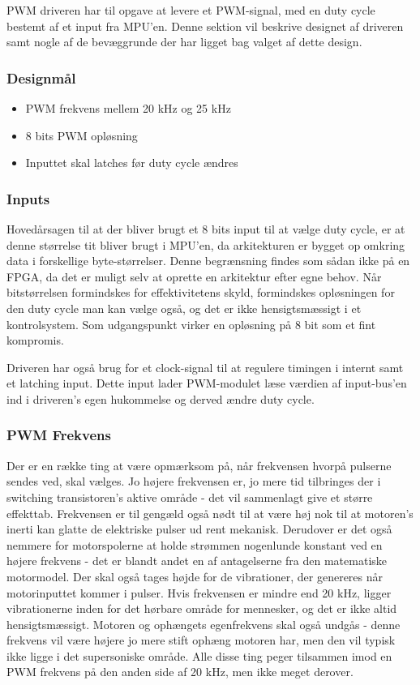 PWM driveren har til opgave at levere et PWM-signal, med en duty cycle bestemt af et input fra MPU'en. Denne sektion vil beskrive designet af driveren samt nogle af de bevæggrunde der har ligget bag valget af dette design.

\subsubsection{Designmål}

\begin{itemize}[noitemsep]

\item PWM frekvens mellem 20 kHz og 25 kHz
\item 8 bits PWM opløsning
\item Inputtet skal latches før duty cycle ændres

\end{itemize}

\subsubsection{Inputs}

Hovedårsagen til at der bliver brugt et 8 bits input til at vælge duty cycle, er at denne størrelse tit bliver brugt i MPU'en, da arkitekturen er bygget op omkring data i forskellige byte-størrelser. Denne begrænsning findes som sådan ikke på en FPGA, da det er muligt selv at oprette en arkitektur efter egne behov. Når bitstørrelsen formindskes for effektivitetens skyld, formindskes opløsningen for den duty cycle man kan vælge også, og det er ikke hensigtsmæssigt i et kontrolsystem. Som udgangspunkt virker en opløsning på 8 bit som et fint kompromis.

Driveren har også brug for et clock-signal til at regulere timingen i internt samt et latching input. Dette input lader PWM-modulet læse værdien af input-bus'en ind i driveren's egen hukommelse og derved ændre duty cycle.

\subsubsection{PWM Frekvens}
Der er en række ting at være opmærksom på, når frekvensen hvorpå pulserne sendes ved, skal vælges. Jo højere frekvensen er, jo mere tid tilbringes der i switching transistoren's aktive område - det vil sammenlagt give et større effekttab. Frekvensen er til gengæld også nødt til at være høj nok til at motoren's inerti kan glatte de elektriske pulser ud rent mekanisk. Derudover er det også nemmere for motorspolerne at holde strømmen nogenlunde konstant ved en højere frekvens - det er blandt andet en af antagelserne fra den matematiske motormodel. Der skal også tages højde for de vibrationer, der genereres når motorinputtet kommer i pulser. Hvis frekvensen er mindre end 20 kHz, ligger vibrationerne inden for det hørbare område for mennesker, og det er ikke altid hensigtsmæssigt. Motoren og ophængets egenfrekvens skal også undgås - denne frekvens vil være højere jo mere stift ophæng motoren har, men den vil typisk ikke ligge i det supersoniske område. Alle disse ting peger tilsammen imod en PWM frekvens på den anden side af 20 kHz, men ikke meget derover. 

